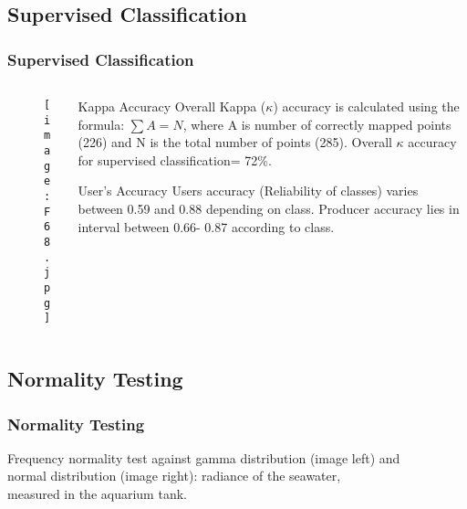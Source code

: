\documentclass[pdflatex,compress,9pt,
	xcolor={dvipsnames,dvipsnames,svgnames,x11names,table},
	hyperref={colorlinks = true,breaklinks = true, urlcolor = NavyBlue, breaklinks = true}]{beamer}
\begin{document}
\subsection{Supervised Classification}
\begin{frame}\frametitle{\alert{Supervised} Classification}

\begin{minipage}[0.4\textheight]{\textwidth}
\begin{columns}[T]
\begin{column}{0.5\textwidth}
\vspace{2em}
\begin{figure}[H]
	\centering
		\texttt{[image: F68.jpg]}
\end{figure}
\end{column}
\begin{column}{0.5\textwidth}

\footnotesize{\begin{alertblock}{Kappa Accuracy}
Overall Kappa ($\kappa$) accuracy  is calculated using the formula: $\sum A=N$, where A is number of correctly mapped points (226) and N is the total number of points (285). Overall $\kappa$ accuracy for supervised classification= 72\%.
\end{alertblock}

\begin{block}{User's Accuracy}
Users accuracy (Reliability of classes) varies between 0.59 and 0.88 depending on class. Producer accuracy lies in interval between 0.66- 0.87 according to class.
\end{block}}
\end{column}
\end{columns}
\end{minipage}

\end{frame}

\subsection{Normality Testing}
\begin{frame}\frametitle{Normality Testing}
Frequency normality test against \alert{gamma distribution} (image left) and \\
\alert{normal distribution} (image right): radiance of the seawater, \\
measured in the aquarium tank.
\begin{figure}[H]
	\centering
			\hspace{1mm}
\end{figure}
\end{frame}
\end{document}
